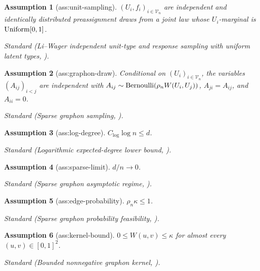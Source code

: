\documentclass{article}
\newtheorem{assumption}{Assumption}
\begin{document}
\begin{assumption}[ass:unit-sampling]\label{ass:unit-sampling}
\((U_i,f_i)_{i\in\mathcal V_n}\) are independent and identically distributed preassignment draws from a joint law whose \(U_i\)-marginal is \({\rm Uniform}[0,1]\).
\par\smallskip\noindent\emph{Standard} (Li--Wager independent unit-type and response sampling with uniform latent types, \cite{LiWager2022RandomGraph}).
\end{assumption}

\begin{assumption}[ass:graphon-draw]\label{ass:graphon-draw}
Conditional on \((U_i)_{i\in\mathcal V_n}\), the variables \((A_{ij})_{i<j}\) are independent with \(A_{ij}\sim{\rm Bernoulli}(\rho_nW(U_i,U_j))\), \(A_{ji}=A_{ij}\), and \(A_{ii}=0\).
\par\smallskip\noindent\emph{Standard} (Sparse graphon sampling, \cite{LiWager2022RandomGraph}).
\end{assumption}

\begin{assumption}[ass:log-degree]\label{ass:log-degree}
\(C_{\log}\log n\le d\).
\par\smallskip\noindent\emph{Standard} (Logarithmic expected-degree lower bound, \cite{AbbeFanWangZhong2020Entrywise}).
\end{assumption}

\begin{assumption}[ass:sparse-limit]\label{ass:sparse-limit}
\(d/n\to0\).
\par\smallskip\noindent\emph{Standard} (Sparse graphon asymptotic regime, \cite{LiWager2022RandomGraph}).
\end{assumption}

\begin{assumption}[ass:edge-probability]\label{ass:edge-probability}
\(\rho_n\kappa\le1\).
\par\smallskip\noindent\emph{Standard} (Sparse graphon probability feasibility, \cite{LiWager2022RandomGraph}).
\end{assumption}

\begin{assumption}[ass:kernel-bound]\label{ass:kernel-bound}
\(0\le W(u,v)\le\kappa\) for almost every \((u,v)\in[0,1]^2\).
\par\smallskip\noindent\emph{Standard} (Bounded nonnegative graphon kernel, \cite{LiWager2022RandomGraph}).
\end{assumption}
\end{document}
